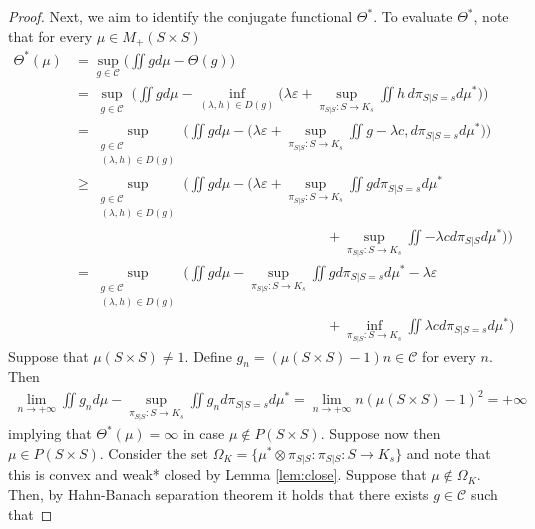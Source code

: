 \documentclass{article}
\theoremstyle{definition}
\theoremstyle{remarksty}
\begin{document}
\begin{proof}
    Next, we aim to identify the conjugate functional $\Theta^*$.
    To evaluate $\Theta^*$, note that for every $\mu \in M_+(S\times S)$
    \begin{align}\label{eq:chai}
        \Theta^*(\mu) &= \sup_{g \in \mathcal{C}} \bigg( \iint g d\mu - \Theta(g) \bigg) \nonumber\\
        &= \sup_{\substack{g \in \mathcal{C}}} \bigg(\iint g d\mu - \inf_{(\lambda, h) \in D(g)} \bigg(\lambda\varepsilon + \sup_{\pi_{S|S} : S \rightarrow K_s} \iint h\, 
        d\pi_{S|S=s} d\mu^* \bigg)\bigg)  \nonumber\\
        & = \sup_{\substack{g \in \mathcal{C}  \nonumber\\ (\lambda, h) \in D(g)}}
        \bigg(\iint g d\mu - \bigg( \lambda\varepsilon + \sup_{\pi_{S|S} : S \rightarrow K_s} \iint g - \lambda c, 
        d\pi_{S|S=s} d\mu^* \bigg) \bigg) \nonumber\\
        & \geq \sup_{\substack{g \in \mathcal{C}  \nonumber\\ (\lambda, h) \in D(g)}}
        \bigg(\iint g d\mu - \bigg( \lambda\varepsilon + \sup_{\pi_{S|S} : S \rightarrow K_s} \iint g d\pi_{S|S=s} d\mu^* \\
        &\qquad\qquad\qquad\qquad\qquad\qquad\qquad\qquad\qquad+ \sup_{\pi_{S|S} : S \rightarrow K_s} \iint - \lambda c d\pi_{S|S} d\mu^* \bigg)\bigg)\nonumber  \\
        & = \sup_{\substack{g \in \mathcal{C} \\ (\lambda, h) \in D(g)}} \bigg( \iint g d\mu - \sup_{\pi_{S|S} : S \rightarrow K_s} \iint g 
        d\pi_{S|S=s} d\mu^* -\lambda \varepsilon \\
        &\qquad\qquad\qquad\qquad\qquad\qquad\qquad\qquad\qquad+ \inf_{\pi_{S|S} : S \rightarrow K_s} \iint  \lambda c d\pi_{S|S=s} d\mu^* \bigg) \nonumber
        \end{align}
        Suppose that $\mu(S\times S) \neq 1$. Define $g_n = (\mu(S \times S) - 1) n \in \mathcal{C}$ for every $n$. Then 
        \begin{align}
            \lim_{n \rightarrow + \infty} \iint g_n d\mu - \sup_{\pi_{S|S} : S \rightarrow K_s} \iint g_n 
        d\pi_{S|S=s} d\mu^* = \lim_{n \rightarrow + \infty}n(\mu(S \times S) - 1)^2 = +\infty 
        \end{align}
implying that $\Theta^*(\mu) = \infty$ in case $\mu \notin P(S\times S)$. Suppose now then $\mu \in P(S\times S)$. Consider the set $\Omega_K = \{\mu^* \otimes \pi_{S|S} : \pi_{S|S}: S\rightarrow K_s\}$ and note that this is convex and weak* closed by Lemma \ref{lem:close}. Suppose that $\mu \notin \Omega_K$. Then, by Hahn-Banach separation theorem it holds that there exists $g \in \mathcal{C}$ such that

\end{proof}
\end{document}

